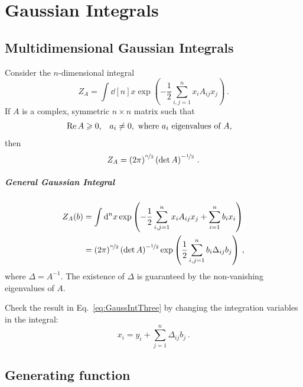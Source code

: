 \documentclass[notes.tex]{subfiles}
\begin{document}
\chapter{Gaussian Integrals}
\label{chap:lec0}

\section{Multidimensional Gaussian Integrals}
\label{sec:mult-gauss-integr}

Consider the $n$-dimensional integral
\begin{equation}
  \label{eq:GaussIntOne}
  Z_A = \int \dd[n]{x} \exp\left(
  -\frac12 \sum_{i,j=1}^n x_i A_{ij} x_j
  \right)\, .
\end{equation}
If $A$ is a complex, symmetric $n\times n$ matrix such that
\begin{align}
   \Re A & \geqslant 0, &
   a_i &\neq 0, \text{ where } a_i\ \text{eigenvalues of } A,
\end{align}
then
\begin{equation}
  \label{eq:GaussIntTwo}
  Z_A = \left(2\pi\right)^{\nicefrac{n}{2}} \left(\det A \right)^{-\nicefrac{1}{2}}\, .
\end{equation}

\paragraph{General Gaussian Integral}

\begin{align}
  Z_A(b) & = \int \dd[n]{x} \exp\left(
  -\frac12 \sum_{i,j=1}^n x_i A_{ij} x_j
  + \sum_{i=1}^n b_i x_i
  \right)                                                                                 \\
  \label{eq:GaussIntThree}
         & =  \left(2\pi\right)^{\nicefrac{n}{2}} \left(\det A \right)^{-\nicefrac{1}{2}}
  \exp\left(
  \frac12 \sum_{i,j=1}^n b_i \Delta_{ij} b_j
  \right) \, ,
\end{align}
where $\Delta = A^{-1}$. The existence of $\Delta$ is guaranteed by the non-vanishing eigenvalues of $A$.
\begin{Ex}
  Check the result in Eq.~\ref{eq:GaussIntThree} by changing the integration variables in the integral:
  \[
    x_i = y_i + \sum_{j=1}^n \Delta_{ij} b_j\, .
  \]
\end{Ex}

\section{Generating function}
\label{sec:generating-function}
\end{document}
